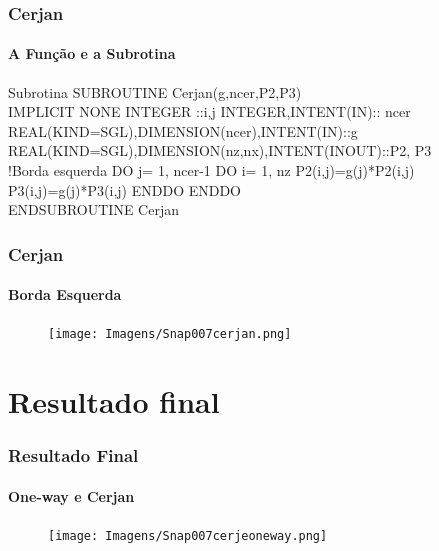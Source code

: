 \documentclass[10pt]{beamer} %
\begin{document}
\begin{frame}
	\frametitle{Cerjan}
	\framesubtitle{A Função e a Subrotina}

	\begin{block}{Subrotina}
	SUBROUTINE Cerjan(g,ncer,P2,P3)
	\linebreak
	\\
   IMPLICIT NONE
    INTEGER ::i,j
    INTEGER,INTENT(IN):: ncer
    REAL(KIND=SGL),DIMENSION(ncer),INTENT(IN)::g
    REAL(KIND=SGL),DIMENSION(nz,nx),INTENT(INOUT)::P2, P3
    \linebreak
    \\
   !Borda esquerda
    DO j= 1, ncer-1
     DO i= 1, nz
        P2(i,j)=g(j)*P2(i,j)
        P3(i,j)=g(j)*P3(i,j)
      ENDDO
    ENDDO
    \linebreak
    \\
	ENDSUBROUTINE Cerjan
	\end{block}
\end{frame}




\begin{frame}
\frametitle{Cerjan}
\framesubtitle{Borda Esquerda}
		\begin{block}{}
			\begin{figure}[H]
				\centering
				\texttt{[image: Imagens/Snap007cerjan.png]}
			\end{figure}
		\end{block}
\end{frame}

\section{Resultado final}


\begin{frame}
		\frametitle{Resultado Final}
		\framesubtitle{One-way e Cerjan}
		\begin{block}{}
			\begin{figure}[H]
				\centering
				\texttt{[image: Imagens/Snap007cerjeoneway.png]}
			\end{figure}
		\end{block}
\end{frame}
\end{document}
